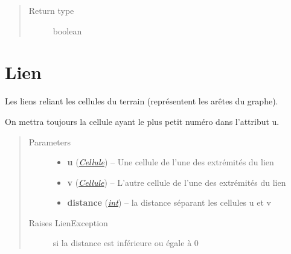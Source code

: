 \documentclass[letterpaper,10pt,english]{sphinxmanual}
\begin{document}
\begin{fulllineitems}
\begin{fulllineitems}
\begin{quote}
\begin{description}
\item[{Return type}] \leavevmode
boolean

\end{description}\end{quote}

\end{fulllineitems}


\end{fulllineitems}



\chapter{Lien}
\label{index:module-Lien}\label{index:lien}

\begin{fulllineitems}
\label{index:Lien.Lien}
Les liens reliant les cellules du terrain (représentent les arêtes du graphe).

On mettra toujours la cellule ayant le plus petit numéro dans l'attribut u.
\begin{quote}\begin{description}
\item[{Parameters}] \leavevmode\begin{itemize}
\item {} 
\textbf{u} ({\hyperref[index:module-Cellule]{\emph{Cellule}}}) -- Une cellule de l'une des extrémités du lien

\item {} 
\textbf{v} ({\hyperref[index:module-Cellule]{\emph{Cellule}}}) -- L'autre cellule de l'une des extrémités du lien

\item {} 
\textbf{distance} (\href{http://docs.python.org/library/functions.html\#int}{\emph{int}}) -- la distance séparant les cellules u et v

\end{itemize}

\item[{Raises LienException}] \leavevmode
si la distance est inférieure ou égale à 0

\end{description}\end{quote}


\end{fulllineitems}
\end{document}
